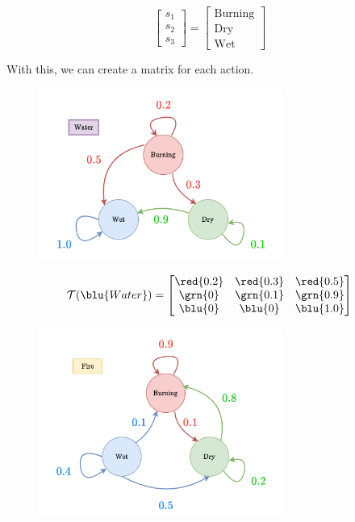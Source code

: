         \begin{equation}
            \begin{bmatrix}
                s_1 \\ s_2 \\ s_3
            \end{bmatrix}
            = 
            \begin{bmatrix}
                \text{Burning} \\ \text{Dry} \\ \text{Wet}
            \end{bmatrix}
        \end{equation}

        With this, we can create a matrix for each action.

        \begin{figure}[H]
            \centering
            \includegraphics[width=80mm,scale=0.4]{images/mdp_images/add_water_transition.png}
        \end{figure}

        \begin{equation}
            \mathcal{T}(\blu{Water}) = 
                \begin{bmatrix}
                \red{0.2} & \red{0.3} & \red{0.5} \\
                \grn{0} & \grn{0.1} & \grn{0.9} \\
                \blu{0} & \blu{0} & \blu{1.0}
            \end{bmatrix}
        \end{equation}

        \begin{figure}[H]
            \centering
            \includegraphics[width=80mm,scale=0.4]{images/mdp_images/add_fire_transition.png}
        \end{figure}

